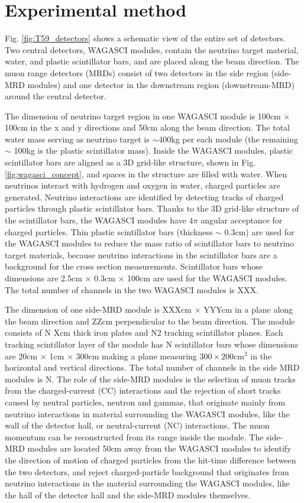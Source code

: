 \section{Experimental method}
Fig. \ref{fig:T59_detectors} shows a schematic view of the entire set of detectors.
Two central detectors, WAGASCI modules, contain the neutrino target material, water, and plastic scintillator bars,
and are placed along the beam direction.
The muon range detectors (MRDs) consist of two detectors in the side region (side-MRD modules)
and one detector in the downstream region (downstream-MRD) around the central detector.


The dimension of neutrino target region in one WAGASCI module is 
100cm $\times$ 100cm in the x and y directions and 50cm along the beam direction.
The total water mass serving as neutrino target is $\sim$400kg per each module (the remaining $\sim$ 100kg is the plastic scintillator mass).
Inside the WAGASCI modules, plastic scintillator bars are aligned as a 3D grid-like structure,
shown in Fig. \ref{fig:wagasci_concept}, and spaces in the structure are filled with water.
When neutrinos interact with hydrogen and oxygen in water, charged particles are generated.
Neutrino interactions are identified by detecting tracks of charged particles through plastic scintillator bars.
Thanks to the 3D grid-like structure of the scintillator bars,
the WAGASCI modules have $4\pi$ angular acceptance for charged particles.
Thin plastic scintillator bars (thickness $\sim$ 0.3cm) are used for the WAGASCI modules
to reduce the mass ratio of scintillator bars to neutrino target materials,
because neutrino interactions in the scintillator bars are a background for the cross section measurements.
Scintillator bars whose dimensions are 2.5cm $\times$ 0.3cm $\times$ 100cm are used for the WAGASCI modules.
The total number of channels in the two WAGASCI modules is XXX.


The dimension of one side-MRD module is XXXcm $\times$ YYYcm 
in a plane along the beam direction and ZZcm perpendicular to the beam direction.
The module consists of N Xcm thick iron plates and N2 tracking scintillator planes.
Each tracking scintillator layer of the module has N scintillator bars whose dimensions are
20cm $\times$ 1cm $\times$ 300cm making a plane measuring $300\times200$cm$^{2}$
in the horizontal and vertical directions.
The total number of channels in the side MRD modules is N.
The role of the side-MRD modules is the selection of muon tracks from the charged-current (CC) interactions and the rejection of short tracks caused by neutral particles, neutron and gammas,
that originate mainly from neutrino interactions in material surrounding the WAGASCI modules,
like the wall of the detector hall, or neutral-current (NC) interactions.
The muon momentum can be reconstructed from its range inside the module.
The side-MRD modules are located 50cm away from the WAGASCI modules to identify the 
direction of motion of charged particles from the hit-time difference between the two detectors,
and reject charged-particle background that originates from neutrino interactions
in the material surrounding the WAGASCI modules, like the hall of the detector hall and the side-MRD modules themselves.


